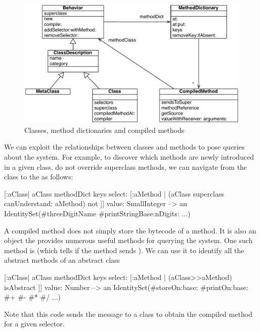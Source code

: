 \documentclass[a4paper,10pt,twoside]{book}
\begin{document}
\begin{figure}[ht]\centering
	\includegraphics[width=\linewidth]{MethodsAsObjects}
	\caption{Classes, method dictionaries and compiled methods}
\end{figure}

We can exploit the relationships between classes and methods to pose queries about the system.
For example, to discover which methods are newly introduced in a given class, \ie do not override superclass methods, we can navigate from the class to the  as follows:
\begin{code}{}
[:aClass| aClass methodDict keys select: [:aMethod |
  (aClass superclass canUnderstand: aMethod) not ]] value: SmallInteger
  --> an IdentitySet(#threeDigitName #printStringBase:nDigits: ...)
\end{code}

A compiled method does not simply store the bytecode of a method.
It is also an object the provides numerous useful methods for querying the system.
One such method is  (which tells if the method sends ).
We can use it to identify all the abstract methods of an abstract class
\begin{code}{}
[:aClass| aClass methodDict keys select: [:aMethod |
  (aClass>>aMethod) isAbstract ]] value: Number
  --> an IdentitySet(#storeOn:base: #printOn:base: #+ #- #* #/ ...)
\end{code}
Note that this code sends the \ct{>>} message to a class to obtain the compiled method for a given selector.

\end{document}

